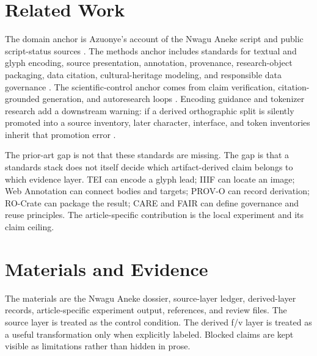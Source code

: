 \documentclass[sigconf,nonacm]{acmart}
\begin{document}
\section{Related Work}
The domain anchor is Azuonye's account of the Nwagu Aneke script and public
script-status sources \cite{azuonye1992,omniglotNwagu,unicodeAfricanScripts2023,scriptSourceNwagu,sirisNwaguProposal}.
The methods anchor includes standards for textual and glyph encoding, source
presentation, annotation, provenance, research-object packaging, data citation,
cultural-heritage modeling, and responsible data governance \cite{azuonye1992,omniglotNwagu,unicodeAfricanScripts2023,scriptSourceNwagu,sirisNwaguProposal,teiP5Glyphs,iiifPresentation3,w3cAnnotationModel,w3cAnnotationVocab,w3cProvO,rocrate12,cidocCrm,datacite45,wilkinson2016fair,carroll2020care,wadden2020scifact,gao2023alce,karpathyAutoresearch,acmSubmissions,arxivSubmitTex}.
The scientific-control anchor comes from claim verification, citation-grounded
generation, and autoresearch loops \cite{wadden2020scifact,gao2023alce,karpathyAutoresearch}.
Encoding guidance and tokenizer research add a downstream warning: if a derived
orthographic split is silently promoted into a source inventory, later character,
interface, and token inventories inherit that promotion error
\cite{seiProposalTips,sennrich2016bpe,kudo2018sentencepiece,bostrom2020bytepair,rust2021tokenization}.

The prior-art gap is not that these standards are missing. The gap is that a
standards stack does not itself decide which artifact-derived claim belongs to
which evidence layer. TEI can encode a glyph lead; IIIF can locate an image;
Web Annotation can connect bodies and targets; PROV-O can record derivation;
RO-Crate can package the result; CARE and FAIR can define governance and reuse
principles. The article-specific contribution is the local experiment and its
claim ceiling.

\section{Materials and Evidence}
The materials are the Nwagu Aneke dossier, source-layer ledger, derived-layer
records, article-specific experiment output, references, and review files.
The source layer is treated as the control condition. The derived f/v layer is
treated as a useful transformation only when explicitly labeled. Blocked claims
are kept visible as limitations rather than hidden in prose.
\end{document}
